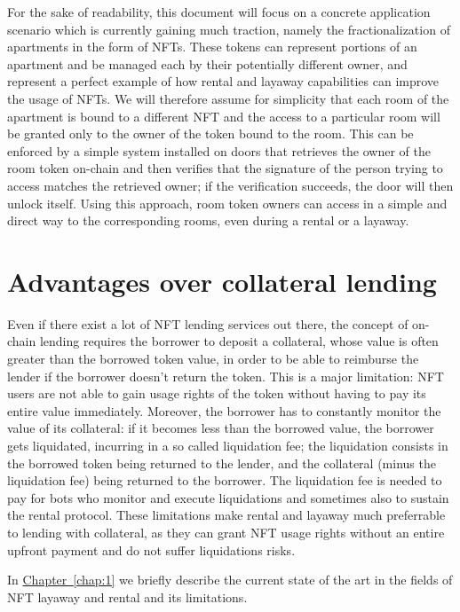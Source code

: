 \documentclass[english, LaM, oneside]{sapthesis}%
\begin{document}
For the sake of readability, this document will focus on a concrete application scenario which is currently gaining much traction, namely the fractionalization of apartments in the form of NFTs. These tokens can represent portions of an apartment and be managed each by their potentially different owner, and represent a perfect example of how rental and layaway capabilities can improve the usage of NFTs.
We will therefore assume for simplicity that each room of the apartment is bound to a different NFT and the access to a particular room will be granted only to the owner of the token bound to the room. This can be enforced by a simple system installed on doors that retrieves the owner of the room token on-chain and then verifies that the signature of the person trying to access matches the retrieved owner; if the verification succeeds, the door will then unlock itself. Using this approach, room token owners can access in a simple and direct way to the corresponding rooms, even during a rental or a layaway.

\section{Advantages over collateral lending}
Even if there exist a lot of NFT lending services out there, the concept of on-chain lending requires the borrower to deposit a collateral, whose value is often greater than the borrowed token value, in order to be able to reimburse the lender if the borrower doesn't return the token. This is a major limitation: NFT users are not able to gain usage rights of the token without having to pay its entire value immediately. Moreover, the borrower has to constantly monitor the value of its collateral: if it becomes less than the borrowed value, the borrower gets liquidated, incurring in a so called liquidation fee; the liquidation consists in the borrowed token being returned to the lender, and the collateral (minus the liquidation fee) being returned to the borrower. The liquidation fee is needed to pay for bots who monitor and execute liquidations and sometimes also to sustain the rental protocol.\newline
These limitations make rental and layaway much preferrable to lending with collateral, as they can grant NFT usage rights without an entire upfront payment and do not suffer liquidations risks.

\bigskip
In \hyperref[chap:1]{Chapter~\ref*{chap:1}} we  briefly describe the current state of the art in the fields of NFT layaway and rental and its limitations.
\end{document}
